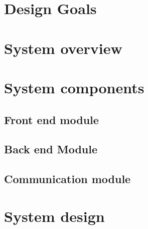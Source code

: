 \section{Design Goals}\label{designgoals}

\section{System overview}\label{overview}

\pagebreak

\section{System components}\label{components}

\subsection{Front end module}

\subsection{Back end Module}

\subsection{Communication module}

\pagebreak

\section{System design}\label{design}

\pagebreak

    
